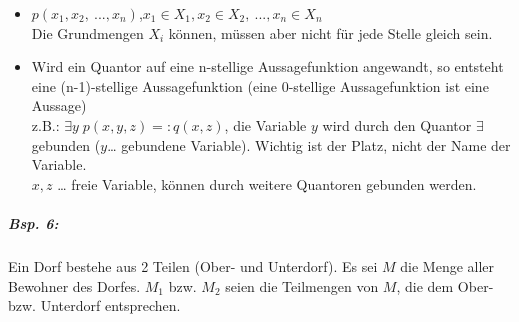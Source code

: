 \begin{itemize}
\item $p(x_1, x_2,\: ..., x_n)$,\quad $x_1 \in X_1, x_2 \in X_2,\: ... , x_n \in X_n$\\
Die Grundmengen $X_i$ können, müssen aber nicht für jede Stelle gleich sein.
\item Wird ein Quantor auf eine n-stellige Aussagefunktion angewandt, so entsteht eine (n-1)-stellige Aussagefunktion (eine 0-stellige Aussagefunktion ist eine Aussage)\\
z.B.: $\exists y \; p(x,y,z)=: q(x,z)$, die Variable $y$ wird durch den Quantor $\exists$ gebunden ($y$… gebundene Variable). Wichtig ist der Platz, nicht der Name der Variable.\\
$x, z$ … freie Variable, können durch weitere Quantoren gebunden werden.
\end{itemize}

\subparagraph{Bsp. 6:} \parskp
Ein Dorf bestehe aus 2 Teilen (Ober- und Unterdorf). Es sei $M$ die Menge aller Bewohner des Dorfes. $M_1$ bzw. $M_2$ seien die Teilmengen von $M$, die dem Ober- bzw. Unterdorf entsprechen. 

